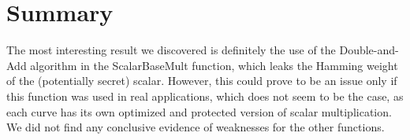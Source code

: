 \documentclass[a4paper]{scrartcl}
\begin{document}

\section{Summary}
The most interesting result we discovered is definitely the use of the Double-and-Add algorithm in the ScalarBaseMult function, which leaks the Hamming weight of the (potentially secret) scalar. However, this could prove to be an issue only if this function was used in real applications, which does not seem to be the case, as each curve has its own optimized and protected version of scalar multiplication. We did not find any conclusive evidence of weaknesses for the other functions.


\end{document}
